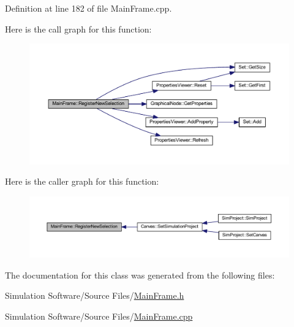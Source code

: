 Definition at line 182 of file Main\+Frame.\+cpp.

Here is the call graph for this function\+:
\nopagebreak
\begin{figure}[H]
\begin{center}
\leavevmode
\includegraphics[width=350pt]{class_main_frame_af5c0679e1a94303e8bd0a0742c25a59b_cgraph}
\end{center}
\end{figure}
Here is the caller graph for this function\+:
\nopagebreak
\begin{figure}[H]
\begin{center}
\leavevmode
\includegraphics[width=350pt]{class_main_frame_af5c0679e1a94303e8bd0a0742c25a59b_icgraph}
\end{center}
\end{figure}


The documentation for this class was generated from the following files\+:\begin{DoxyCompactItemize}
\item 
Simulation Software/\+Source Files/\hyperlink{_main_frame_8h}{Main\+Frame.\+h}\item 
Simulation Software/\+Source Files/\hyperlink{_main_frame_8cpp}{Main\+Frame.\+cpp}\end{DoxyCompactItemize}

